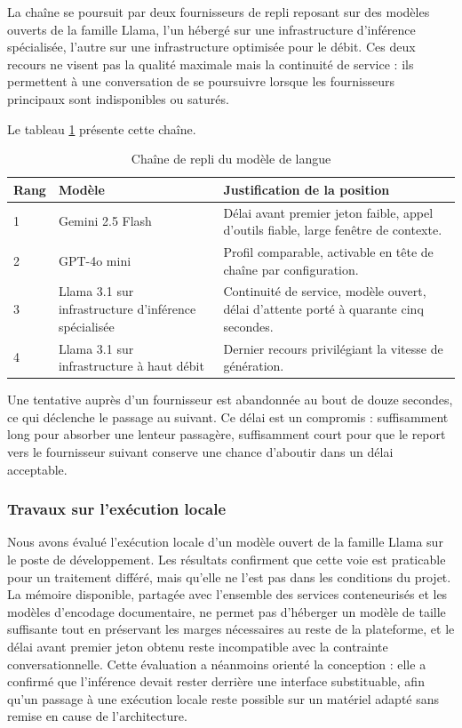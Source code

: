 La chaîne se poursuit par deux fournisseurs de repli reposant sur des modèles ouverts de la famille Llama, l'un hébergé sur une infrastructure d'inférence spécialisée, l'autre sur une infrastructure optimisée pour le débit. Ces deux recours ne visent pas la qualité maximale mais la continuité de service : ils permettent à une conversation de se poursuivre lorsque les fournisseurs principaux sont indisponibles ou saturés.

Le tableau \ref{tab:llm-chaine} présente cette chaîne.

\begin{table}[H]
\centering
\renewcommand{\arraystretch}{1.25}
\begin{tabular}{|p{1.2cm}|p{4.2cm}|p{9.1cm}|}
\hline
\textbf{Rang} & \textbf{Modèle} & \textbf{Justification de la position} \\
\hline
1 & Gemini 2.5 Flash & Délai avant premier jeton faible, appel d'outils fiable, large fenêtre de contexte. \\
\hline
2 & GPT-4o mini & Profil comparable, activable en tête de chaîne par configuration. \\
\hline
3 & Llama 3.1 sur infrastructure d'inférence spécialisée & Continuité de service, modèle ouvert, délai d'attente porté à quarante cinq secondes. \\
\hline
4 & Llama 3.1 sur infrastructure à haut débit & Dernier recours privilégiant la vitesse de génération. \\
\hline
\end{tabular}
\caption{Chaîne de repli du modèle de langue}
\label{tab:llm-chaine}
\end{table}

Une tentative auprès d'un fournisseur est abandonnée au bout de douze secondes, ce qui déclenche le passage au suivant. Ce délai est un compromis : suffisamment long pour absorber une lenteur passagère, suffisamment court pour que le report vers le fournisseur suivant conserve une chance d'aboutir dans un délai acceptable.

\subsubsection{Travaux sur l'exécution locale}

Nous avons évalué l'exécution locale d'un modèle ouvert de la famille Llama sur le poste de développement. Les résultats confirment que cette voie est praticable pour un traitement différé, mais qu'elle ne l'est pas dans les conditions du projet. La mémoire disponible, partagée avec l'ensemble des services conteneurisés et les modèles d'encodage documentaire, ne permet pas d'héberger un modèle de taille suffisante tout en préservant les marges nécessaires au reste de la plateforme, et le délai avant premier jeton obtenu reste incompatible avec la contrainte conversationnelle. Cette évaluation a néanmoins orienté la conception : elle a confirmé que l'inférence devait rester derrière une interface substituable, afin qu'un passage à une exécution locale reste possible sur un matériel adapté sans remise en cause de l'architecture.

